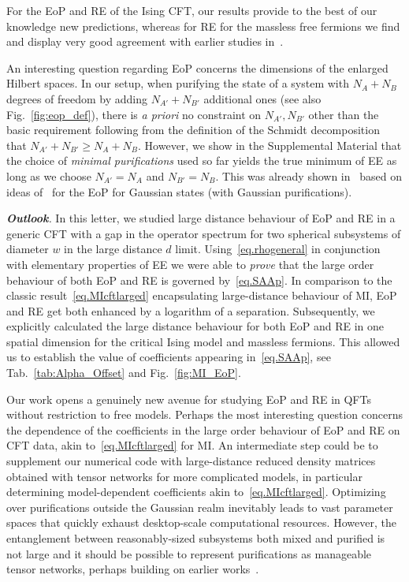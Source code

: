 \documentclass[prl,a4paper,notitlepage,twocolumn,superscriptaddress,longbibliography,reprint]{revtex4-2}
\newcommand{\mysection}[1]{{\vspace{10 pt}\noindent \emph{{\textbf{#1}}.}}}
\begin{document}
For the EoP and RE of the Ising CFT, our results provide to the best of our knowledge new predictions, whereas for RE for the massless free fermions we find and display very good agreement with earlier studies in~\cite{Bueno:2020vnx}. 

An interesting question regarding EoP concerns the dimensions of the enlarged Hilbert spaces. In our setup, when purifying the state of a system with $N_A+N_B$ degrees of freedom by adding $N_{A'}+N_{B'}$ additional ones (see also Fig.~\ref{fig:eop_def}), there is \emph{a priori} no constraint on $N_{A'},N_{B'}$ other than the basic requirement following from the definition of the Schmidt decomposition that $N_{A'}+N_{B'}\geq N_A+N_B$. However, we show in the Supplemental Material that the choice of \textsl{minimal purifications} used so far yields the true minimum of EE as long as we choose $N_{A'}=N_A$ and $N_{B'}=N_B$. This was already shown in~\cite{Windt:2020tra} based on ideas of~\cite{Hackl:2020viw} for the EoP for Gaussian states (with Gaussian purifications).

\mysection{Outlook} In this letter, we studied large distance behaviour of EoP and RE in a generic CFT with a gap in the operator spectrum for two spherical subsystems of diameter $w$ in the large distance $d$ limit. Using~\eqref{eq.rhogeneral} in conjunction with elementary properties of EE we were able to \emph{prove} that the large order behaviour of both EoP and RE is governed by~\eqref{eq.SAAp}. In comparison to the classic result~\eqref{eq.MIcftlarged} encapsulating large-distance behaviour of MI, EoP and RE get both enhanced by a logarithm of a separation. Subsequently, we explicitly calculated the large distance behaviour for both EoP and RE in one spatial dimension for the critical Ising model and massless fermions. This allowed us to establish the value of coefficients appearing in~\eqref{eq.SAAp}, see Tab.~\ref{tab:Alpha_Offset} and Fig.~\ref{fig:MI_EoP}.

Our work opens a genuinely new avenue for studying EoP and RE in QFTs without restriction to free models. Perhaps the most interesting question concerns the dependence of the coefficients in the large order behaviour of EoP and RE on CFT data, akin to~\eqref{eq.MIcftlarged} for MI. An intermediate step could be to supplement our numerical code with large-distance reduced density matrices obtained with tensor networks for more complicated models, in particular determining model-dependent coefficients akin to~\eqref{eq.MIcftlarged}. Optimizing over purifications outside the Gaussian realm inevitably leads to vast parameter spaces that quickly exhaust desktop-scale computational resources. However, the entanglement between reasonably-sized subsystems both mixed and purified is not large and it should be possible to represent purifications as manageable tensor networks, perhaps building on earlier works~\cite{Nguyen:2017yqw,TNpurifications}.
\end{document}
